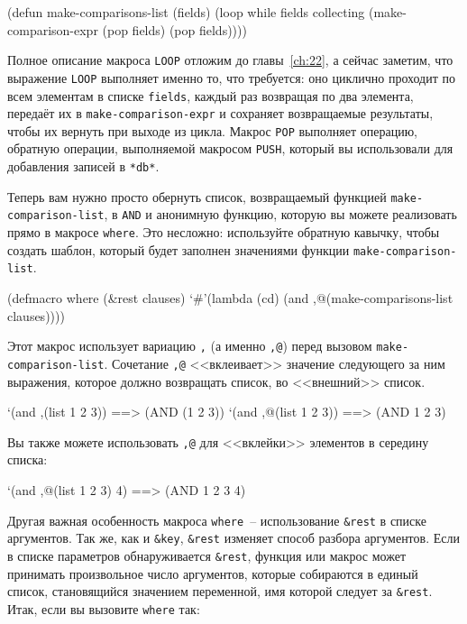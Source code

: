 \begin{myverb}
(defun make-comparisons-list (fields)
  (loop while fields
     collecting (make-comparison-expr (pop fields) (pop fields))))
\end{myverb}

Полное описание макроса \lstinline{LOOP} отложим до главы~\ref{ch:22}, а сейчас заметим, что выражение
\lstinline{LOOP} выполняет именно то, что требуется: оно циклично проходит по всем элементам в
списке \lstinline{fields}, каждый раз возвращая по два элемента, передаёт их в
\lstinline{make-comparison-expr} и сохраняет возвращаемые результаты, чтобы их вернуть при
выходе из цикла. Макрос \lstinline{POP} выполняет операцию, обратную операции, выполняемой макросом
\lstinline{PUSH}, который вы использовали для добавления записей в \lstinline{*db*}.

Теперь вам нужно просто обернуть список, возвращаемый функцией \lstinline{make-comparison-list},
в \lstinline{AND} и анонимную функцию, которую вы можете реализовать прямо в макросе
\lstinline{where}. Это несложно: используйте обратную кавычку, чтобы создать шаблон, который
будет заполнен значениями функции \lstinline{make-comparison-list}.

\begin{myverb}
(defmacro where (&rest clauses)
  `#'(lambda (cd) (and ,@(make-comparisons-list clauses))))
\end{myverb}

Этот макрос использует вариацию \lstinline{,} (а именно \lstinline{,@}) перед вызовом
\lstinline{make-comparison-list}. Сочетание \lstinline{,@} <<вклеивает>> значение следующего за ним
выражения, которое должно возвращать список, во <<внешний>> список.

\begin{myverb}
`(and ,(list 1 2 3))  ==> (AND (1 2 3))
`(and ,@(list 1 2 3)) ==> (AND 1 2 3)
\end{myverb}

Вы также можете использовать \lstinline{,@} для <<вклейки>> элементов в середину списка:

\begin{myverb}
`(and ,@(list 1 2 3) 4) ==> (AND 1 2 3 4)
\end{myverb}

Другая важная особенность макроса \lstinline{where}~-- использование \lstinline{&rest} в списке
аргументов. Так же, как и \lstinline!&key!, \lstinline{&rest} изменяет способ разбора
аргументов. Если в списке параметров обнаруживается \lstinline{&rest}, функция или макрос может
принимать произвольное число аргументов, которые собираются в единый список, становящийся
значением переменной, имя которой следует за \lstinline{&rest}. Итак, если вы вызовите
\lstinline{where} так:

